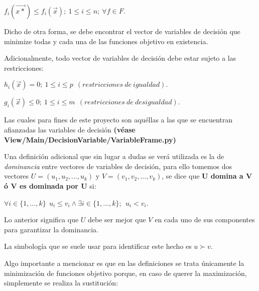 \documentclass[letterpaper,10pt,english]{sphinxmanual}
\begin{document}
\begin{center}\(f_i(\vec{x*}) \leqslant f_i(\vec{x});\ 1 \leqslant i \leqslant n;\ \forall f \in F\).
\end{center}
\begin{DUlineblock}{0em}
\item[] Dicho de otra forma, se debe encontrar el vector de variables de decisión que minimize todas y cada una de las
funciones objetivo en existencia.
\item[] Adicionalmente, todo vector de variables de decisión debe estar sujeto a las restricciones:
\end{DUlineblock}

\begin{center}\(h_i(\vec{x}) = 0;\ 1 \leqslant i \leqslant p\ \ (restricciones\ de\ igualdad).\)
\end{center}
\begin{center}\(g_i(\vec{x}) \leqslant 0;\ 1 \leqslant i \leqslant m\ \ (restricciones\ de\ desigualdad).\)
\end{center}
\begin{DUlineblock}{0em}
\item[] Las cuales para fines de este proyecto son aquéllas a las que se encuentran afianzadas
las variables de decisión \textbf{(véase View/Main/DecisionVariable/VariableFrame.py)}
\item[] 
\item[] Una definición adicional que sin lugar a dudas se verá utilizada es la de \emph{dominancia} entre vectores de variables de decisión,
para ello tomemos dos vectores \(U = (u_1,u_2,...,u_k)\) y \(V = (v_1,v_2,...,v_k)\), se dice
que \textbf{U domina a V ó V es dominada por U} si:
\end{DUlineblock}

\begin{center}\(\forall i \in \{1,...,k\}\ \ u_i \leqslant v_i \land \exists i \in \{1,...,k\}; \ \ u_i < v_i\).
\end{center}
\begin{DUlineblock}{0em}
\item[] Lo anterior significa que \(U\) debe ser mejor que \(V\) en cada uno de sus componentes para garantizar la dominancia.
\item[] La simbología que se suele usar para identificar este hecho es \(u \succ v\).
\item[] 
\item[] Algo importante a mencionar es que en las definiciones se trata únicamente la minimización
de funciones objetivo porque, en caso de querer la maximización, simplemente se realiza la
sustitución:
\end{DUlineblock}
\end{document}
